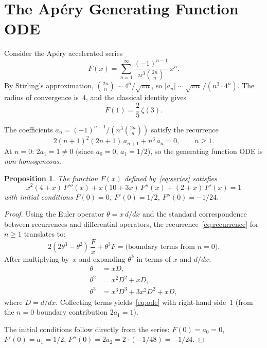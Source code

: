 \documentclass[11pt]{article}
\newtheorem{proposition}[theorem]{Proposition}
\begin{document}
\section{The Ap\'ery Generating Function ODE}

Consider the Ap\'ery accelerated series
\begin{equation}\label{eq:series}
  F(x) = \sum_{n=1}^{\infty} \frac{(-1)^{n-1}}{n^3 \binom{2n}{n}}\, x^n.
\end{equation}
By Stirling's approximation, $\binom{2n}{n} \sim 4^n/\sqrt{\pi n}$,
so $|a_n| \sim \sqrt{\pi n}\, / (n^3 \cdot 4^n)$.
The radius of convergence is~$4$, and the classical identity gives
\begin{equation}\label{eq:F1}
  F(1) = \frac{2}{5}\,\zeta(3).
\end{equation}

The coefficients $a_n = (-1)^{n-1}/(n^3\binom{2n}{n})$ satisfy the recurrence
\begin{equation}\label{eq:recurrence}
  2(n+1)^2(2n+1)\,a_{n+1} + n^3\,a_n = 0, \qquad n \ge 1.
\end{equation}
At $n=0$: $2 a_1 = 1 \ne 0$ (since $a_0 = 0$, $a_1 = 1/2$),
so the generating function ODE is \emph{non-homogeneous}.

\begin{proposition}\label{prop:ode}
The function $F(x)$ defined by~\eqref{eq:series} satisfies
\begin{equation}\label{eq:ode}
  x^2(4+x)\,F'''(x) + x(10+3x)\,F''(x) + (2+x)\,F'(x) = 1
\end{equation}
with initial conditions $F(0)=0$, $F'(0)=1/2$, $F''(0)=-1/24$.
\end{proposition}

\begin{proof}
Using the Euler operator $\theta = x\,d/dx$ and the standard correspondence
between recurrences and differential operators, the recurrence~\eqref{eq:recurrence}
for $n \ge 1$ translates to:
\[
  2(2\theta^3 - \theta^2)\,\frac{F}{x} + \theta^3 F = \text{(boundary terms from $n=0$)}.
\]
After multiplying by~$x$ and expanding $\theta^k$ in terms of $x$ and $d/dx$:
\begin{align*}
  \theta &= xD, \\
  \theta^2 &= x^2 D^2 + xD, \\
  \theta^3 &= x^3 D^3 + 3x^2 D^2 + xD,
\end{align*}
where $D = d/dx$.
Collecting terms yields~\eqref{eq:ode} with right-hand side~$1$
(from the $n=0$ boundary contribution $2a_1 = 1$).

The initial conditions follow directly from the series:
$F(0) = a_0 = 0$, $F'(0) = a_1 = 1/2$,
$F''(0) = 2a_2 = 2 \cdot (-1/48) = -1/24$.
\end{proof}
\end{document}
